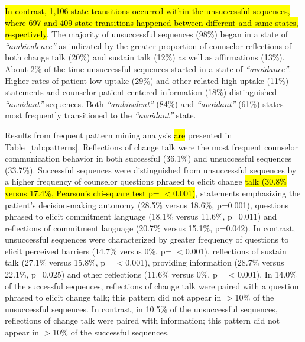 \documentclass[smallextended]{svjour3}       %
\begin{document}
\hl{In contrast, 1,106 state transitions occurred within the unsuccessful sequences, where 697 and 409 state transitions happened between different and same states, respectively}. The majority of unsuccessful sequences (98\%) began in a state of \textit{``ambivalence''} as indicated by the greater proportion of counselor reflections of both change talk (20\%) and sustain talk (12\%) as well as affirmations (13\%). About 2\% of the time unsuccessful sequences started in a state of \textit{``avoidance''}. Higher rates of patient low uptake (29\%) and other-related high uptake (11\%) statements and counselor patient-centered information (18\%) distinguished \textit{``avoidant''} sequences. Both \textit{``ambivalent''} (84\%) and \textit{``avoidant''} (61\%) states most frequently transitioned to the \textit{``avoidant''} state.

Results from frequent pattern mining analysis \hl{are} presented in Table~\ref{tab:patterns}. Reflections of change talk were the most frequent counselor communication behavior in both successful (36.1\%) and unsuccessful sequences (33.7\%). Successful sequences were distinguished from unsuccessful sequences by a higher frequency of counselor questions phrased to elicit change \hl{talk (30.8\% versus 17.4\%, Pearson's chi-square test p= $<$0.001)}, statements emphasizing the patient's decision-making autonomy (28.5\% versus 18.6\%, p=0.001), questions phrased to elicit commitment language (18.1\% versus 11.6\%, p=0.011) and reflections of commitment language (20.7\% versus 15.1\%, p=0.042). In contrast, unsuccessful sequences were characterized by greater frequency of questions to elicit perceived barriers (14.7\% versus 0\%, p= $<$0.001), reflections of sustain talk (27.1\% versus 15.8\%, p= $<$0.001), providing information (28.7\% versus 22.1\%, p=0.025) and other reflections (11.6\% versus 0\%, p= $<$0.001). In 14.0\% of the successful sequences, reflections of change talk were paired with a question phrased to elicit change talk; this pattern did not appear in $>$10\% of the unsuccessful sequences. In contrast, in 10.5\% of the unsuccessful sequences, reflections of change talk were paired with information; this pattern did not appear in $>$10\% of the successful sequences.
\end{document}
